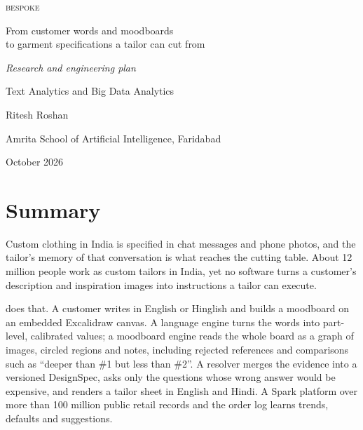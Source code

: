 \documentclass[11pt,oneside,openany]{book}
\begin{document}
\frontmatter
\pagestyle{empty}

\begin{titlepage}
\centering
\vspace*{38mm}
{\fontsize{40}{44}\selectfont\scshape bespoke\par}
\vspace{12mm}
{\Large From customer words and moodboards\\[3pt] to garment specifications a tailor can cut from\par}
\vspace{16mm}
{\large\itshape Research and engineering plan\par}
\vspace{4mm}
{\normalsize\color{soft} Text Analytics and Big Data Analytics\par}
\vfill
{\large Ritesh Roshan\par}
\vspace{12mm}
{\normalsize Amrita School of Artificial Intelligence, Faridabad\par}
\vspace{3mm}
{\normalsize\color{soft} October 2026\par}
\vspace*{14mm}
\end{titlepage}

\chapter*{Summary}
\pagestyle{body}
Custom clothing in India is specified in chat messages and phone photos, and the tailor's memory of that conversation is what reaches the cutting table. About 12 million people work as custom tailors in India, yet no software turns a customer's description and inspiration images into instructions a tailor can execute.

\sys{} does that. A customer writes in English or Hinglish and builds a moodboard on an embedded Excalidraw canvas. A language engine turns the words into part-level, calibrated values; a moodboard engine reads the whole board as a graph of images, circled regions and notes, including rejected references and comparisons such as ``deeper than \#1 but less than \#2''. A resolver merges the evidence into a versioned DesignSpec, asks only the questions whose wrong answer would be expensive, and renders a tailor sheet in English and Hindi. A Spark platform over more than 100 million public retail records and the order log learns trends, defaults and suggestions.
\end{document}
